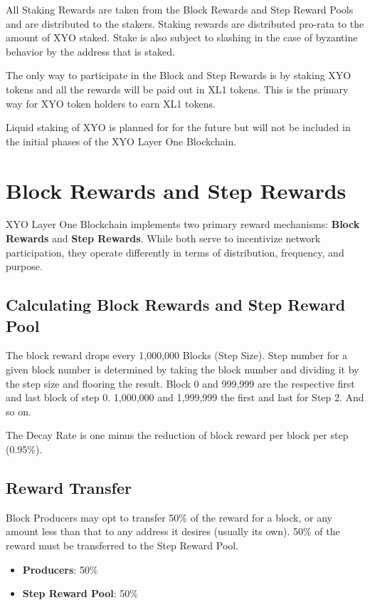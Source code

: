 \documentclass{article}
\begin{document}
All Staking Rewards are taken from the Block Rewards and Step Reward Pools and
are distributed to the stakers. Staking rewards are distributed pro-rata to the
amount of XYO staked. Stake is also subject to slashing in the case of
byzantine behavior by the address that is staked.

The only way to participate in the Block and Step Rewards is by staking XYO
tokens and all the rewards will be paid out in XL1 tokens. This is the primary
way for XYO token holders to earn XL1 tokens.

Liquid staking of XYO is planned for for the future but will not be included in
the initial phases of the XYO Layer One Blockchain.

\section{Block Rewards and Step Rewards}

XYO Layer One Blockchain implements two primary reward mechanisms:
\textbf{Block Rewards} and \textbf{Step Rewards}. While both serve to
incentivize network participation, they operate differently in terms of
distribution, frequency, and purpose.

\subsection{Calculating Block Rewards and Step Reward Pool}
The block reward drops every 1,000,000 Blocks (Step Size). Step number for a
given block number is determined by taking the block number and dividing it by
the step size and flooring the result. Block 0 and 999,999 are the respective
first and last block of step 0. 1,000,000 and 1,999,999 the first and last for
Step 2. And so on.

The Decay Rate is one minus the reduction of block reward per block per step
(0.95\%).

\subsection{Reward Transfer}
Block Producers may opt to transfer 50\% of the reward for a block, or any
amount less than that to any address it desires (usually its own). 50\% of the
reward must be transferred to the Step Reward Pool.

\begin{itemize}
    \item \textbf{Producers}: 50\%
    \item \textbf{Step Reward Pool}: 50\%
\end{itemize}
\end{document}
